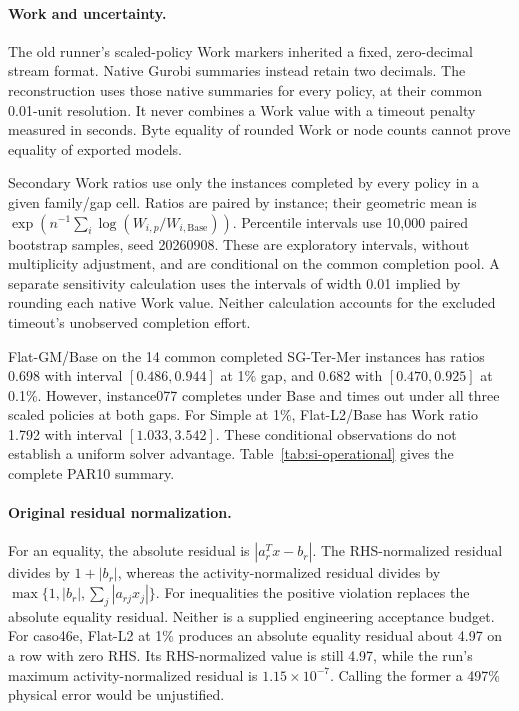 \documentclass[11pt]{article}
\begin{document}
\paragraph{Work and uncertainty.}
The old runner's scaled-policy Work markers inherited a fixed, zero-decimal stream
format. Native Gurobi summaries instead retain two decimals. The reconstruction uses
those native summaries for every policy, at their common 0.01-unit resolution. It
never combines a Work value with a timeout penalty measured in seconds. Byte equality
of rounded Work or node counts cannot prove equality of exported models.

Secondary Work ratios use only the instances completed by every policy in a given
family/gap cell. Ratios are paired by instance; their geometric mean is
$\exp(n^{-1}\sum_i\log(W_{i,p}/W_{i,\mathrm{Base}}))$. Percentile intervals use
10,000 paired bootstrap samples, seed 20260908. These are exploratory intervals,
without multiplicity adjustment, and are conditional on the common completion pool.
A separate sensitivity calculation uses the intervals of width 0.01 implied by
rounding each native Work value. Neither calculation accounts for the excluded
timeout's unobserved completion effort.

Flat-GM/Base on the 14 common completed SG-Ter-Mer instances has ratios 0.698
with interval $[0.486,0.944]$ at 1\% gap, and 0.682 with $[0.470,0.925]$ at
0.1\%. However, instance077 completes under Base and times out under all three
scaled policies at both gaps. For Simple at 1\%, Flat-L2/Base has Work ratio 1.792
with interval $[1.033,3.542]$. These conditional observations do not establish a
uniform solver advantage. Table~\ref{tab:si-operational} gives the complete PAR10 summary.

\begin{table}[tb]
\centering\small
\caption{Reconstructed operational campaign. Arithmetic mean PAR10 in seconds on the
15 assigned instances per cell; a timeout contributes 18,000 seconds. Parentheses give
completed runs. All rows concern Gurobi.}\label{tab:si-operational}

\end{table}

\paragraph{Original residual normalization.}
For an equality, the absolute residual is $|a_r^Tx-b_r|$. The RHS-normalized
residual divides by $1+|b_r|$, whereas the activity-normalized residual divides by
$\max\{1,|b_r|,\sum_j|a_{rj}x_j|\}$. For inequalities the positive violation replaces the
absolute equality residual. Neither is a supplied engineering acceptance budget.
For caso46e, Flat-L2 at 1\% produces an absolute equality residual about 4.97 on
a row with zero RHS. Its RHS-normalized value is still 4.97, while the run's maximum
activity-normalized residual is $1.15\times10^{-7}$. Calling the former a 497\%
physical error would be unjustified.
\end{document}
